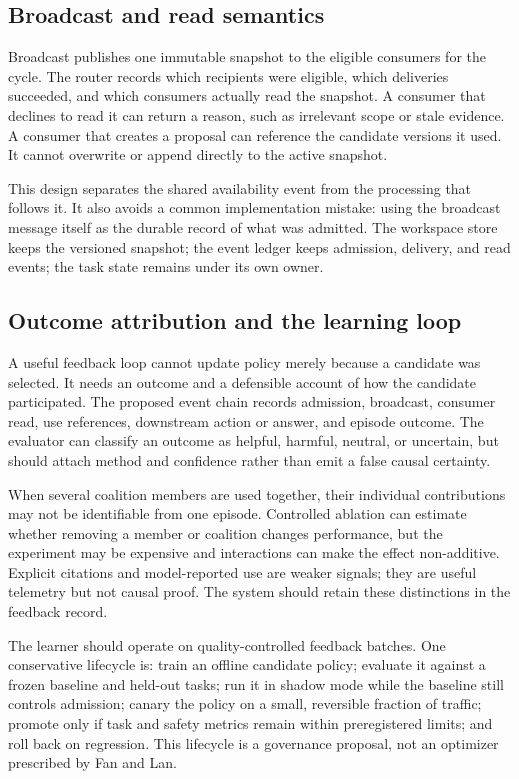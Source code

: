 \subsection{Broadcast and read semantics}

Broadcast publishes one immutable snapshot to the eligible consumers for the cycle. The router records which recipients were eligible, which deliveries succeeded, and which consumers actually read the snapshot. A consumer that declines to read it can return a reason, such as irrelevant scope or stale evidence. A consumer that creates a proposal can reference the candidate versions it used. It cannot overwrite or append directly to the active snapshot.

This design separates the shared availability event from the processing that follows it. It also avoids a common implementation mistake: using the broadcast message itself as the durable record of what was admitted. The workspace store keeps the versioned snapshot; the event ledger keeps admission, delivery, and read events; the task state remains under its own owner.

\subsection{Outcome attribution and the learning loop}

A useful feedback loop cannot update policy merely because a candidate was selected. It needs an outcome and a defensible account of how the candidate participated. The proposed event chain records admission, broadcast, consumer read, use references, downstream action or answer, and episode outcome. The evaluator can classify an outcome as helpful, harmful, neutral, or uncertain, but should attach method and confidence rather than emit a false causal certainty.

When several coalition members are used together, their individual contributions may not be identifiable from one episode. Controlled ablation can estimate whether removing a member or coalition changes performance, but the experiment may be expensive and interactions can make the effect non-additive. Explicit citations and model-reported use are weaker signals; they are useful telemetry but not causal proof. The system should retain these distinctions in the feedback record.

The learner should operate on quality-controlled feedback batches. One conservative lifecycle is: train an offline candidate policy; evaluate it against a frozen baseline and held-out tasks; run it in shadow mode while the baseline still controls admission; canary the policy on a small, reversible fraction of traffic; promote only if task and safety metrics remain within preregistered limits; and roll back on regression. This lifecycle is a governance proposal, not an optimizer prescribed by Fan and Lan.

